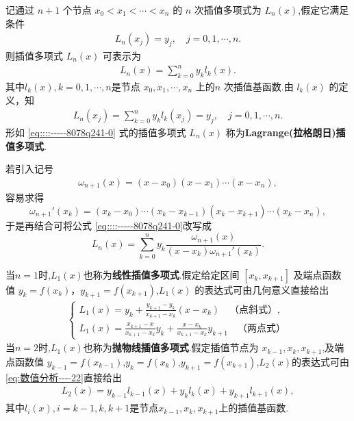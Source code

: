 \documentclass[../../main.tex]{subfiles}
\begin{document}
\begin{theorem}
记通过 $n + 1$ 个节点 $x_0 < x_1 < \cdots < x_n$ 的 $n$ 次插值多项式为 $L_n(x)$,假定它满足条件 
\begin{align}
L_n(x_j) = y_j, \quad j = 0, 1, \cdots, n.\label{equation::::----9812792387--89274}
\end{align}
则插值多项式 $L_n(x)$ 可表示为
\begin{align}
L_n(x) = \sum_{k = 0}^n y_k l_k(x).\label{eq::::-----8078q241-0}
\end{align}
其中$l_k(x),k=0,1,\cdots,n$是节点 $x_0, x_1, \cdots, x_n$ 上的$n$ 次插值基函数.由 $l_k(x)$ 的定义，知 
\begin{align}
L_n(x_j) = \sum_{k = 0}^n y_k l_k(x_j) = y_j, \quad j = 0, 1, \cdots, n.\label{eq:数值分析----22}
\end{align}
形如 \eqref{eq::::-----8078q241-0} 式的插值多项式 $L_n(x)$ 称为\textbf{Lagrange(拉格朗日)插值多项式}.

若引入记号 
\begin{align}
\omega_{n + 1}(x) = (x - x_0)(x - x_1) \cdots (x - x_n),\label{eq:数值分析-2.10}
\end{align}
容易求得 
\[
\omega_{n + 1}'(x_k) = (x_k - x_0) \cdots (x_k - x_{k - 1})(x_k - x_{k + 1}) \cdots (x_k - x_n),
\]
于是再结合可将公式 \eqref{eq::::-----8078q241-0}改写成 
\[
L_n(x) = \sum_{k = 0}^n y_k \frac{\omega_{n + 1}(x)}{(x - x_k) \omega_{n + 1}'(x_k)}.
\]
\end{theorem}
\begin{remark}
当$n=1$时,$L_1(x)$也称为\textbf{线性插值多项式}.假定给定区间 $[x_k, x_{k + 1}]$ 及端点函数值 $y_k = f(x_k)$，$y_{k + 1} = f(x_{k + 1})$,$L_1(x)$ 的表达式可由几何意义直接给出 
\begin{align}
\begin{cases} 
L_1(x) = y_k + \frac{y_{k + 1} - y_k}{x_{k + 1} - x_k}(x - x_k) \quad \text{（点斜式）}, \\ 
L_1(x) = \frac{x_{k + 1} - x}{x_{k + 1} - x_k} y_k + \frac{x - x_k}{x_{k + 1} - x_k} y_{k + 1} \quad \text{（两点式）} 
\end{cases}\label{eq::---8978980678--891213--2.1}
\end{align}
当$n=2$时,$L_1(x)$也称为\textbf{抛物线插值多项式}.假定插值节点为 $x_{k - 1}, x_k, x_{k + 1}$,及端点函数值 $y_{k-1} = f(x_{k-1})$,$y_k=f(x_k)$,$y_{k + 1} = f(x_{k + 1})$,$L_2(x)$的表达式可由\eqref{eq:数值分析----22}直接给出
\begin{align}\label{eq:数值分析-2.5}
L_2\left( x \right) =y_{k-1}l_{k-1}\left( x \right) +y_kl_k\left( x \right) +y_{k+1}l_{k+1}\left( x \right),
\end{align}
其中$l_i\left( x \right) ,i=k-1,k,k+1$是节点$x_{k-1},x_k,x_{k+1}$上的插值基函数.
\end{remark}
\end{document}
